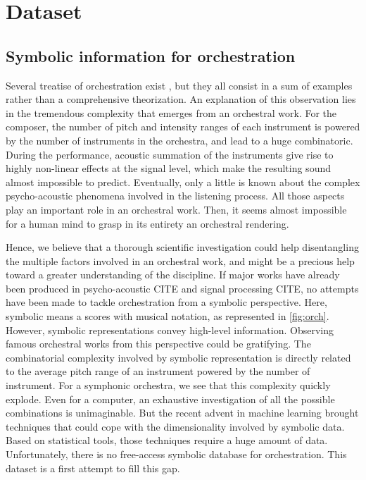 \documentclass[twoside,twocolumn]{article}
\begin{document}
\section{Dataset}
\subsection{Symbolic information for orchestration}
Several treatise of orchestration exist \cite{koechli_orch,piston-orch,Rimsky-Korsakov:1873aa}, but they all consist in a sum of examples rather than a comprehensive theorization.
An explanation of this observation lies in the tremendous complexity that emerges from an orchestral work. For the composer, the number of pitch and intensity ranges of each instrument is powered by the number of instruments in the orchestra, and lead to a huge combinatoric. During the performance, acoustic summation of the instruments give rise to highly non-linear effects at the signal level, which make the resulting sound almost impossible to predict. Eventually, only a little is known about the complex psycho-acoustic phenomena involved in the listening process. All those aspects play an important role in an orchestral work. Then, it seems almost impossible for a human mind to grasp in its entirety an orchestral rendering.

Hence, we believe that a thorough scientific investigation could help disentangling the multiple factors involved in an orchestral work, and might be a precious help toward a greater understanding of the discipline.
If major works have already been produced in psycho-acoustic CITE and signal processing CITE, no attempts have been made to tackle orchestration from a symbolic perspective.
Here, symbolic means a scores with musical notation, as represented in \ref{fig:orch}.
However, symbolic representations convey high-level information. Observing famous orchestral works from this perspective could be gratifying.
The combinatorial complexity involved by symbolic representation is directly related to the average pitch range of an instrument powered by the number of instrument. For a symphonic orchestra, we see that this complexity quickly explode. Even for a computer, an exhaustive investigation of all the possible combinations is unimaginable.
But the recent advent in machine learning brought techniques that could cope with the dimensionality involved by symbolic data.
Based on statistical tools, those techniques require a huge amount of data. Unfortunately, there is no free-access symbolic database for orchestration.
This dataset is a first attempt to fill this gap.
\end{document}
